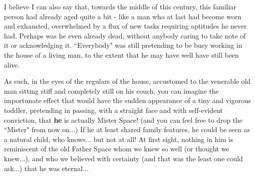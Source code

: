 I believe I can also say that, towards the middle of this century, this familiar person had already aged quite a bit - like a man who at last had become worn and exhausted, overwhelmed by a flux of new tasks requiring aptitudes he never had. Perhaps was he even already dead, without anybody caring to take note of it or acknowledging it. ``Everybody" was still pretending to be busy working in the house of a living man, to the extent that he may have well have still been alive. 

As such, in the eyes of the regulars of the house, accustomed to the venerable old man sitting stiff and completely still on his couch, you can imagine the importunate effect that would have the sudden appearance of a tiny and vigorous toddler, pretending in passing, with a straight face and with self-evident conviction, that \textbf{he} is actually Mister Space! (and you can feel free to drop the ``Mister" from now on...) If he at least shared family features, he could be seen as a natural child, who knows... but not at all! At first sight, nothing in him is reminiscent of the old Father Space whom we knew so well (or thought we knew...), and who we believed with certainty (and that was the least one could ask...) that he was eternal...

